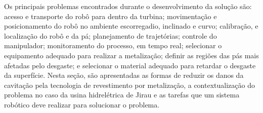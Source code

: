 Os principais problemas encontrados durante o desenvolvimento da solução
são: acesso e transporte do robô para dentro da turbina; movimentação e
posicionamento do robô no ambiente escorregadio, inclinado e curvo; calibração,
e localização do robô e da pá; planejamento de trajetórias; controle do
manipulador; monitoramento do processo, em tempo real; selecionar o equipamento
adequado para realizar a metalização; definir as regiões das pás mais afetadas
pelo desgaste; e selecionar o material adequado para retardar o desgaste da
superfície. Nesta seção, são apresentadas as formas de reduzir os danos da
cavitação pela tecnologia de revestimento por metalização, a contextualização
do problema no caso da usina hidrelétrica de Jirau e as tarefas que um sistema
robótico deve realizar para solucionar o problema.

